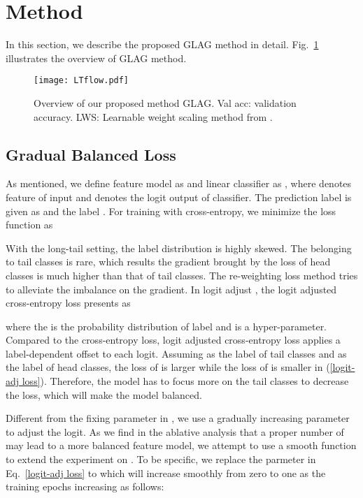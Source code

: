 \documentclass[runningheads]{llncs}
\begin{document}
\vspace{-5mm}

\section{Method}
In this section, we describe the proposed GLAG method in detail. Fig.~\ref{fig:LT pipeline} illustrates the overview of GLAG method.
\begin{figure}
\centering
\texttt{[image: LTflow.pdf]}
\caption{Overview of our proposed method GLAG. Val acc: validation accuracy. LWS: Learnable weight scaling method from \cite{kang2019decoupling}.}

\label{fig:LT pipeline}
\end{figure}

\subsection{Gradual Balanced Loss}
 As mentioned, we define feature model as  and linear classifier as , where  denotes feature of input  and  denotes the logit output of classifier. The prediction label is given as  and the label . For training with cross-entropy, we minimize the loss function as
 

 
With the long-tail setting, the label distribution is highly skewed. The  belonging to tail classes is rare, which results the gradient brought by the loss of head classes is much higher than that of tail classes. The re-weighting loss method tries to alleviate the imbalance on the gradient. In logit adjust \cite{menon2020long}, the logit adjusted cross-entropy loss presents as
 

where the  is the probability distribution of label and  is a hyper-parameter. Compared to the cross-entropy loss, logit adjusted cross-entropy loss applies a label-dependent offset to each logit. Assuming  as the label of tail classes and  as the label of head classes, the loss of  is larger while the loss of  is smaller in (\ref{logit-adj loss}). Therefore, the model has to focus more on the tail classes to decrease the loss, which will make the model balanced. 

Different from the fixing parameter in \cite{menon2020long}, we use a gradually increasing parameter  to adjust the logit. As we find in the ablative analysis that a proper number of  may lead to a more balanced feature model, we attempt to use a smooth function to extend the experiment on . To be specific, we replace the parmeter  in Eq.~\ref{logit-adj loss} to  which will increase smoothly from zero to one as the training epochs increasing as follows:
\end{document}
